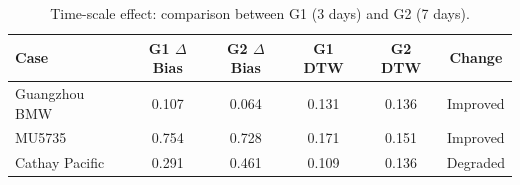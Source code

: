 \begin{table}[t]
\centering
\caption{Time-scale effect: comparison between G1 (3 days) and G2 (7 days).}
\label{tab:time_scale}
\begin{tabular}{lccccc}
\toprule
Case & G1 $\Delta$Bias & G2 $\Delta$Bias & G1 DTW & G2 DTW & Change \\
\midrule
Guangzhou BMW & 0.107 & 0.064 & 0.131 & 0.136 & Improved \\
MU5735 & 0.754 & 0.728 & 0.171 & 0.151 & Improved \\
Cathay Pacific & 0.291 & 0.461 & 0.109 & 0.136 & Degraded \\
\bottomrule
\end{tabular}
\end{table}
